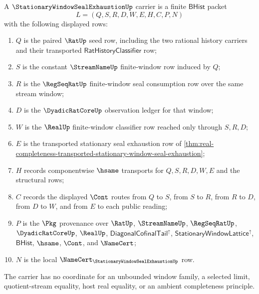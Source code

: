 \begin{definition}
\label{def:stationary-window-seal-exhaustion-carrier}
A $\StationaryWindowSealExhaustionUp$ carrier is a finite $\mathsf{BHist}$ packet
$$
L=(Q,S,R,D,W,E,H,C,P,N)
$$
with the following displayed rows:
\begin{enumerate}
\item $Q$ is the paired $\RatUp$ seed row, including the two rational history carriers and their transported $\mathsf{RatHistoryClassifier}$ row;
\item $S$ is the constant $\StreamNameUp$ finite-window row induced by $Q$;
\item $R$ is the $\RegSeqRatUp$ finite-window seal consumption row over the same stream window;
\item $D$ is the $\DyadicRatCoreUp$ observation ledger for that window;
\item $W$ is the $\RealUp$ finite-window classifier row reached only through $S,R,D$;
\item $E$ is the transported stationary seal exhaustion row of \autoref{thm:real-completeness-transported-stationary-window-seal-exhaustion};
\item $H$ records componentwise $\hsame$ transports for $Q,S,R,D,W,E$ and the structural rows;
\item $C$ records the displayed $\Cont$ routes from $Q$ to $S$, from $S$ to $R$, from $R$ to $D$, from $D$ to $W$, and from $E$ to each public reading;
\item $P$ is the $\Pkg$ provenance over $\RatUp$, $\StreamNameUp$, $\RegSeqRatUp$, $\DyadicRatCoreUp$, $\RealUp$, $\mathsf{DiagonalCofinalTail}^{\uparrow}$, $\mathsf{StationaryWindowLattice}^{\uparrow}$, $\mathsf{BHist}$, $\hsame$, $\Cont$, and $\NameCert$;
\item $N$ is the local $\NameCert_{\StationaryWindowSealExhaustionUp}$ row.
\end{enumerate}
The carrier has no coordinate for an unbounded window family, a selected limit, quotient-stream equality, host real equality, or an ambient completeness principle.
\end{definition}

